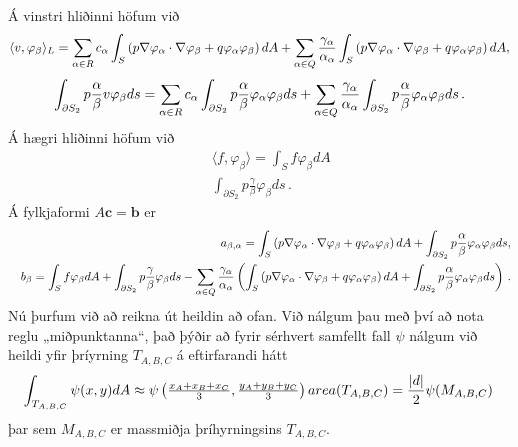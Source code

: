 \documentclass[a4paper,10pt,icelandic]{sphinxmanual}
\begin{document}
Á vinstri hliðinni höfum við
\begin{equation*}
\begin{split}\langle v, \varphi_\beta \rangle_L =
\sum_{\alpha\in R} c_\alpha \int_S \left(p \nabla \varphi_\alpha \cdot \nabla \varphi_\beta +q \varphi_\alpha \varphi_\beta\right) dA
+\sum_{\alpha\in Q} {\gamma_\alpha\over \alpha_\alpha} \int_S \left(p \nabla \varphi_\alpha \cdot \nabla \varphi_\beta +q \varphi_\alpha \varphi_\beta\right) dA,\end{split}
\end{equation*}\begin{equation*}
\begin{split}\int_{\partial S_2} p\frac{\alpha}{\beta} v\varphi_\beta ds=
\sum_{\alpha\in R} c_\alpha\int_{\partial S_2} p\frac{\alpha}{\beta} \varphi_\alpha \varphi_\beta ds+
\sum_{\alpha\in Q} {\gamma_\alpha\over \alpha_\alpha} \int_{\partial S_2}p\frac{\alpha}{\beta} \varphi_\alpha \varphi_\beta ds\,.\end{split}
\end{equation*}
Á hægri hliðinni höfum við
\begin{equation*}
\begin{split}&&\langle f, \varphi_\beta\rangle= \int_S f\varphi_\beta dA
\\
&& \int_{\partial S_2} p\frac{\gamma}{\beta} \varphi_\beta ds\,.\end{split}
\end{equation*}
Á fylkjaformi \(A{\mathbf c}={\mathbf b}\) er
\begin{equation*}
\begin{split}&& a_{\beta, \alpha}= \int_S \left(p \nabla \varphi_\alpha \cdot \nabla \varphi_\beta +q \varphi_\alpha \varphi_\beta\right) dA+\int_{\partial S_2} p\frac{\alpha}{\beta} \varphi_\alpha \varphi_\beta ds,
\\
&& b_\beta = \int_S f\varphi_\beta dA+\int_{\partial S_2} p\frac{\gamma}{\beta} \varphi_\beta ds-
\sum_{\alpha\in Q} {\gamma_\alpha\over \alpha_\alpha} \left(\int_S \left(p \nabla \varphi_\alpha \cdot \nabla \varphi_\beta +q \varphi_\alpha \varphi_\beta\right) dA+\int_{\partial S_2}p\frac{\alpha}{\beta} \varphi_\alpha \varphi_\beta ds\right)\,.\end{split}
\end{equation*}
Nú þurfum við að reikna út heildin að ofan. Við nálgum þau með því að nota reglu „miðpunktanna“, það þýðir að fyrir sérhvert samfellt fall \(\psi\) nálgum við heildi yfir þríyrning \(T_{A,B,C}\) á eftirfarandi hátt
\begin{equation*}
\begin{split}\int_{T_{A,B,C}} \psi(x,y)dA\approx \psi\left(\tfrac{x_A+x_B+x_C}{3},\tfrac{y_A+y_B+y_C}{3}\right) area(T_{A,B,C}) ={|d|\over 2}\psi(M_{A,B,C})\,\end{split}
\end{equation*}
þar sem \(M_{A,B,C}\) er massmiðja þríhyrningsins \(T_{A,B,C}\).
\end{document}
